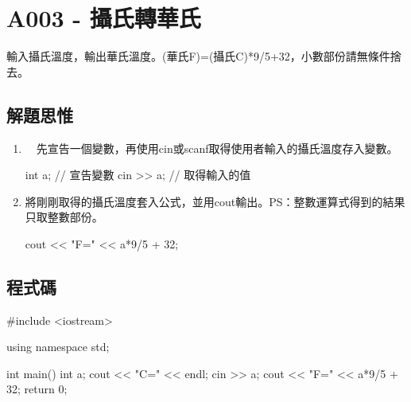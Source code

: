 \section{A003 - 攝氏轉華氏}
輸入攝氏溫度，輸出華氏溫度。(華氏F)=(攝氏C)*9/5+32，小數部份請無條件捨去。
\subsection{解題思惟}
\begin{enumerate}
\item　先宣告一個變數，再使用cin或scanf取得使用者輸入的攝氏溫度存入變數。
\begin{inside}
	int a; // 宣告變數
	cin >> a; // 取得輸入的值
\end{inside}
\item 將剛剛取得的攝氏溫度套入公式，並用cout輸出。PS：整數運算式得到的結果只取整數部份。
\begin{inside}
	cout << "F=" << a*9/5 + 32;
\end{inside}
\end{enumerate}

\subsection{程式碼}
\begin{cppcode}
#include <iostream>

using namespace std;

int main()
{
	int a;
	cout << "C=" << endl;
	cin >> a;
	cout << "F=" << a*9/5 + 32;
	return 0;
}
\end{cppcode}
